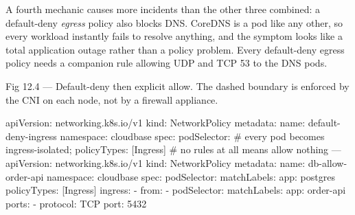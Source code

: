 A fourth mechanic causes more incidents than the other three combined: a default-deny \emph{egress} policy also blocks DNS. CoreDNS is a pod like any other, so every workload instantly fails to resolve anything, and the symptom looks like a total application outage rather than a policy problem. Every default-deny egress policy needs a companion rule allowing UDP and TCP 53 to the DNS pods.

\begin{wbfigure}{Fig 12.4 — Default-deny then explicit allow. The dashed boundary is enforced by the CNI on each node, not by a firewall appliance.}
\end{wbfigure}

\begin{k8sbox}
apiVersion: networking.k8s.io/v1
kind: NetworkPolicy
metadata:
  name: default-deny-ingress
  namespace: cloudbase
spec:
  podSelector: {}         # every pod becomes ingress-isolated;
  policyTypes: [Ingress]  # no rules at all means allow nothing
---
apiVersion: networking.k8s.io/v1
kind: NetworkPolicy
metadata:
  name: db-allow-order-api
  namespace: cloudbase
spec:
  podSelector:
    matchLabels: { app: postgres }
  policyTypes: [Ingress]
  ingress:
    - from:
        - podSelector:
            matchLabels: { app: order-api }
      ports:
        - protocol: TCP
          port: 5432
\end{k8sbox}

